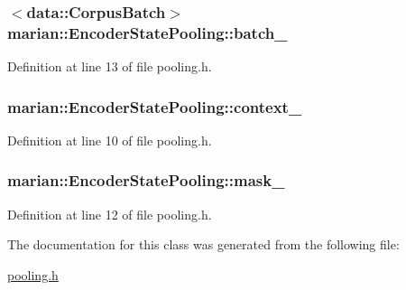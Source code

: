 \subsubsection[{\texorpdfstring{batch\+\_\+}{batch_}}]{$<${\bf data\+::\+Corpus\+Batch}$>$ marian\+::\+Encoder\+State\+Pooling\+::batch\+\_\+\hspace{0.3cm}{\ttfamily [private]}}\hypertarget{classmarian_1_1EncoderStatePooling_adbdcc152b7a78c92b4eaeb849e128874}{}\label{classmarian_1_1EncoderStatePooling_adbdcc152b7a78c92b4eaeb849e128874}


Definition at line 13 of file pooling.\+h.

\subsubsection[{\texorpdfstring{context\+\_\+}{context_}}]{ marian\+::\+Encoder\+State\+Pooling\+::context\+\_\+\hspace{0.3cm}{\ttfamily [private]}}\hypertarget{classmarian_1_1EncoderStatePooling_a22341e3d6177b35fe1cadbacabb989a3}{}\label{classmarian_1_1EncoderStatePooling_a22341e3d6177b35fe1cadbacabb989a3}


Definition at line 10 of file pooling.\+h.

\subsubsection[{\texorpdfstring{mask\+\_\+}{mask_}}]{ marian\+::\+Encoder\+State\+Pooling\+::mask\+\_\+\hspace{0.3cm}{\ttfamily [private]}}\hypertarget{classmarian_1_1EncoderStatePooling_ad023ae72c350215cdb4748391a0e6bb6}{}\label{classmarian_1_1EncoderStatePooling_ad023ae72c350215cdb4748391a0e6bb6}


Definition at line 12 of file pooling.\+h.



The documentation for this class was generated from the following file\+:\begin{DoxyCompactItemize}
\item 
\hyperlink{pooling_8h}{pooling.\+h}\end{DoxyCompactItemize}
